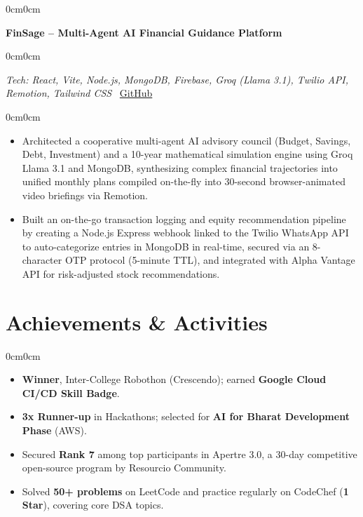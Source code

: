 \documentclass[10pt, letterpaper]{article}
\newenvironment{highlights}{
    \begin{itemize}[leftmargin=10pt, itemsep=1pt, topsep=2pt]
}{
    \end{itemize}
}
\newenvironment{onecolentry}{
    \begin{adjustwidth}{0cm}{0cm}
}{
    \end{adjustwidth}
}
\begin{document}
\vspace{0.1cm}

\begin{onecolentry}
\textbf{FinSage -- Multi-Agent AI Financial Guidance Platform}
\end{onecolentry}

\begin{onecolentry}
\textit{Tech: React, Vite, Node.js, MongoDB, Firebase, Groq (Llama 3.1), Twilio API, Remotion, Tailwind CSS} \hfill
{\color{iconGray}\faGithub}~\href{https://github.com/Omkarop0808}{GitHub}
\end{onecolentry}

\begin{onecolentry}
\begin{highlights}
\item Architected a cooperative multi-agent AI advisory council (Budget, Savings, Debt, Investment) and a 10-year mathematical simulation engine using Groq Llama 3.1 and MongoDB, synthesizing complex financial trajectories into unified monthly plans compiled on-the-fly into 30-second browser-animated video briefings via Remotion.
\item Built an on-the-go transaction logging and equity recommendation pipeline by creating a Node.js Express webhook linked to the Twilio WhatsApp API to auto-categorize entries in MongoDB in real-time, secured via an 8-character OTP protocol (5-minute TTL), and integrated with Alpha Vantage API for risk-adjusted stock recommendations.
\end{highlights}
\end{onecolentry}

\section{Achievements \& Activities}
\begin{onecolentry}
\begin{highlights}
\item \textbf{Winner}, Inter-College Robothon (Crescendo); earned \textbf{Google Cloud CI/CD Skill Badge}.
\item \textbf{3x Runner-up} in Hackathons; selected for \textbf{AI for Bharat Development Phase} (AWS).
\item Secured \textbf{Rank 7} among top participants in Apertre 3.0, a 30-day competitive open-source program by Resourcio Community.
\item Solved \textbf{50+ problems} on LeetCode and practice regularly on CodeChef (\textbf{1 Star}), covering core DSA topics.
\end{highlights}
\end{onecolentry}
\end{document}
